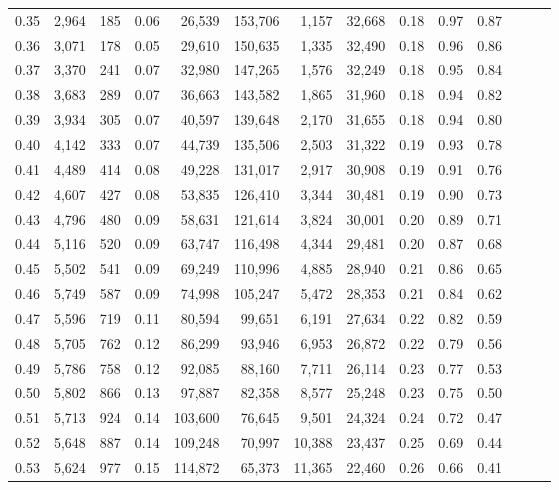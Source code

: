 \begin{tabular}{rrrrrrrrrrrrrr}
0.35 &  2,964 &    185 &  0.06 &   26,539 &  153,706 &   1,157 &  32,668 &  0.18 &  0.97 &      0.87 \\
0.36 &  3,071 &    178 &  0.05 &   29,610 &  150,635 &   1,335 &  32,490 &  0.18 &  0.96 &      0.86 \\
0.37 &  3,370 &    241 &  0.07 &   32,980 &  147,265 &   1,576 &  32,249 &  0.18 &  0.95 &      0.84 \\
0.38 &  3,683 &    289 &  0.07 &   36,663 &  143,582 &   1,865 &  31,960 &  0.18 &  0.94 &      0.82 \\
0.39 &  3,934 &    305 &  0.07 &   40,597 &  139,648 &   2,170 &  31,655 &  0.18 &  0.94 &      0.80 \\
0.40 &  4,142 &    333 &  0.07 &   44,739 &  135,506 &   2,503 &  31,322 &  0.19 &  0.93 &      0.78 \\
0.41 &  4,489 &    414 &  0.08 &   49,228 &  131,017 &   2,917 &  30,908 &  0.19 &  0.91 &      0.76 \\
0.42 &  4,607 &    427 &  0.08 &   53,835 &  126,410 &   3,344 &  30,481 &  0.19 &  0.90 &      0.73 \\
0.43 &  4,796 &    480 &  0.09 &   58,631 &  121,614 &   3,824 &  30,001 &  0.20 &  0.89 &      0.71 \\
0.44 &  5,116 &    520 &  0.09 &   63,747 &  116,498 &   4,344 &  29,481 &  0.20 &  0.87 &      0.68 \\
0.45 &  5,502 &    541 &  0.09 &   69,249 &  110,996 &   4,885 &  28,940 &  0.21 &  0.86 &      0.65 \\
0.46 &  5,749 &    587 &  0.09 &   74,998 &  105,247 &   5,472 &  28,353 &  0.21 &  0.84 &      0.62 \\
0.47 &  5,596 &    719 &  0.11 &   80,594 &   99,651 &   6,191 &  27,634 &  0.22 &  0.82 &      0.59 \\
0.48 &  5,705 &    762 &  0.12 &   86,299 &   93,946 &   6,953 &  26,872 &  0.22 &  0.79 &      0.56 \\
0.49 &  5,786 &    758 &  0.12 &   92,085 &   88,160 &   7,711 &  26,114 &  0.23 &  0.77 &      0.53 \\
0.50 &  5,802 &    866 &  0.13 &   97,887 &   82,358 &   8,577 &  25,248 &  0.23 &  0.75 &      0.50 \\
0.51 &  5,713 &    924 &  0.14 &  103,600 &   76,645 &   9,501 &  24,324 &  0.24 &  0.72 &      0.47 \\
0.52 &  5,648 &    887 &  0.14 &  109,248 &   70,997 &  10,388 &  23,437 &  0.25 &  0.69 &      0.44 \\
0.53 &  5,624 &    977 &  0.15 &  114,872 &   65,373 &  11,365 &  22,460 &  0.26 &  0.66 &      0.41 \\

\end{tabular}
